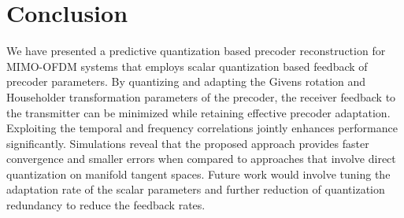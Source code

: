 \documentclass[journal,10pt,twocolumn]{IEEEtran}
\begin{document}



\section{Conclusion}
\label{section4}
We have presented a predictive quantization based precoder
reconstruction for MIMO-OFDM systems that employs scalar quantization
based feedback of precoder parameters. By quantizing and adapting the
Givens rotation and Householder transformation parameters of the
precoder, the receiver feedback to the transmitter can be minimized
while retaining effective precoder adaptation. Exploiting the temporal
and frequency correlations jointly enhances performance
significantly. Simulations reveal that the proposed approach provides
faster convergence and smaller errors when compared to
approaches that involve direct quantization on manifold tangent
spaces. Future work would involve tuning the adaptation rate of the
scalar parameters and further reduction of quantization redundancy to
reduce the feedback rates.


\vspace{-10pt}











\renewcommand{\bibfont}{\footnotesize}




\end{document}
